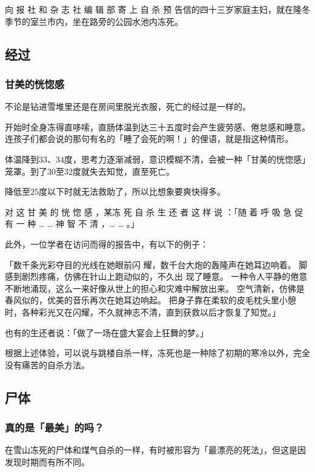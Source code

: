 \documentclass[UTF8]{ctexart}
\begin{document}
向 报 社 和 杂 志 社 编 辑 部 寄 上 自 杀 预 告信的四十三岁家庭主妇，就在隆冬季节的室兰市内，坐在路旁的公园水池内冻死。


\subsection{经过}

\subsubsection*{甘美的恍惚感}

不论是钻进雪堆里还是在房间里脱光衣服，死亡的经过是一样的。

开始时全身冻得直哆嗦，直肠体温到达三十五度时会产生疲劳感、倦怠感和睡意。连孩子们都会说的那句有名的「睡了会死的啊！」的俚语，就是指这种情形。

体温降到$33$、$34$度，思考力逐渐减弱，意识模糊不清，会被一种「甘美的恍惚感」笼罩。到了$30$至$32$度就失去知觉，直至死亡。

降低至$25$度以下时就无法救助了，所以比想象要爽快得多。

对 这 甘 美 的 恍 惚 感 ，某冻 死 自 杀 生 还 者 这 样 说 ：「随 着 呼 吸 急 促 有 一 种 … … 神 智 不 清 ，… … 。」

此外，一位学者在访问而得的报告中，有以下的例子：

「数千条光彩夺目的光线在她眼前闪 耀，数千台大炮的轰隆声在她耳边响着。
脚感到剧烈疼痛，仿佛在针山上跑动似的，不久出 现了睡意。
一种令人平静的倦意不断地涌现，这么一来好像从世上的担心和灾难中解放出来。
空气清新，仿佛是春风似的，优美的音乐再次在她耳边响起。
把身子靠在柔软的皮毛枕头里小憩时，各种彩光又在闪耀，不久就神志不清，直到获救以后才恢复了知觉。」 

也有的生还者说：「做了一场在盛大宴会上狂舞的梦。」

根据上述体验，可以说与跳楼自杀一样，冻死也是一种除了初期的寒冷以外，完全没有痛苦的自杀方法。

\subsection{尸体}

\subsubsection*{真的是「最美」的吗？}


在雪山冻死的尸体和煤气自杀的一样，有时被形容为「最漂亮的死法」，但这是因发现时期而有所不同。
\end{document}
